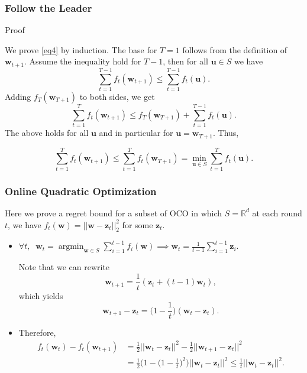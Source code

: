 \documentclass{beamer}
\DeclareMathOperator*{\argmin}{argmin}
\newcommand{\R}{\mathbb{R}}
\newcommand{\uu}{\mathbf{u}}
\newcommand{\z}{\mathbf{z}}
\newcommand{\w}{\mathbf{w}}
\begin{document}
\begin{frame}
\frametitle{Follow the Leader}

\begin{block}{Proof}

We prove \eqref{eq4} by induction. The base for $T = 1$ follows from the definition of $\w_{t+1}$. Assume the inequality hold for $T-1$, then for all $\uu \in S$ we have
\vspace{-0.3cm}
\begin{equation}
\label{eq5}
\sum_{t = 1}^{T-1} f_t(\w_{t+1}) \leq \sum_{t = 1}^{T-1} f_t(\uu).
\end{equation}
\vspace{-0.1cm}
\pause
Adding $f_T(\w_{T+1})$ to both sides, we get
\vspace{-0.1cm}
\begin{equation}
\label{eq6}
\sum_{t = 1}^{T} f_t(\w_{t+1}) \leq f_T(\w_{T+1}) + \sum_{t = 1}^{T-1} f_t(\uu).
\end{equation}
\vspace{-0.1cm}
\pause
The above holds for all $\uu$ and in particular for $\uu = \w_{T+1}$. Thus, \vspace{-0.3cm}

\begin{equation}
\label{eq7}
\sum_{t = 1}^{T} f_t(\w_{t+1}) \leq  \sum_{t = 1}^{T} f_t(\w_{T+1}) = \min_{\uu \in S} \sum_{t = 1}^{T} f_t(\uu).
\end{equation}

\end{block}
\end{frame}

\begin{frame}
\frametitle{Online Quadratic Optimization}

Here we prove a regret bound for a subset of OCO in which $S = \R^d$  at each round $t$, we have $f_t (\w) = ||\w - \z_t||_2^2$ for some $\z_t$.
\pause
\begin{itemize}
\item 
$\forall t, \;\; \w_t = \argmin_{\w \in S} \sum_{i = 1}^{t-1} f_i(\w) \implies \w_t = \frac{1}{t-1}\sum_{i=1}^{t-1}\z_i$. 

\vspace{0.2cm}
Note that we can rewrite
$$\w_{t +1} = \frac{1}{t}\left(\z_t + (t-1)\w_t\right),$$
which yields
$$\w_{t+1} - \z_t = \Big(1-\frac{1}{t}\Big)(\w_t - \z_t).$$

\pause
\item Therefore,
\begin{align*}
f_t(\w_t) - f_t(\w_{t+1}) &= \frac{1}{2} ||\w_t - \z_t||^2 - \frac{1}{2} ||\w_{t+1}-\z_t||^2\\ &=\frac{1}{2}\Big(1-\big(1-\frac{1}{t}\big)^2\Big)||\w_t-\z_t||^2 \leq \frac{1}{t} ||\w_t-\z_t||^2.
\end{align*}

\end{itemize}

\end{frame}
\end{document}
